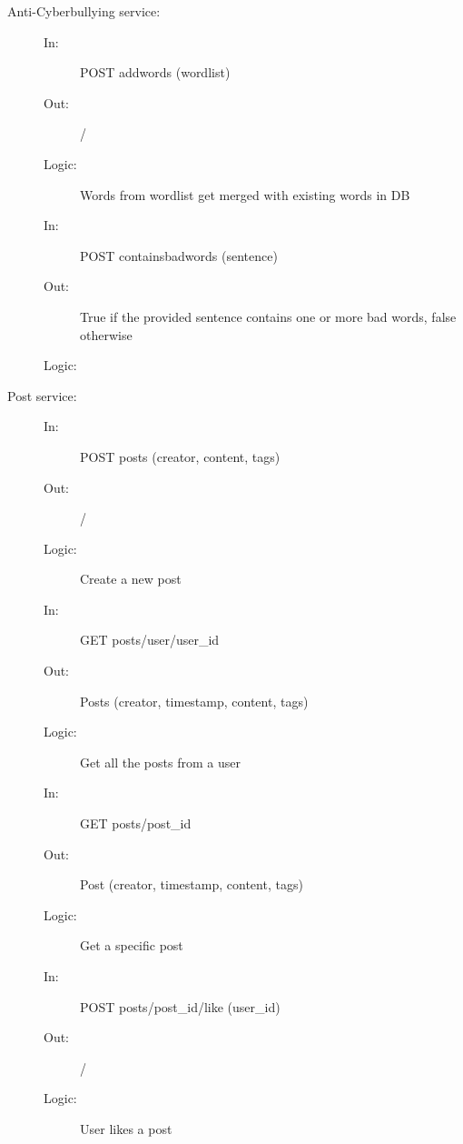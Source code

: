 \documentclass{article}
\begin{document}
\begin{description}
    \item [Anti-Cyberbullying service:] 
    \begin{description}
        \item[]
        \item[In:] POST addwords (wordlist)
        \item[Out:] /
        \item[Logic:] Words from wordlist get merged with existing words in DB
        \item[]
        
        \item[In:] POST containsbadwords (sentence)
        \item[Out:] True if the provided sentence contains one or more bad words, false otherwise
        \item[Logic:] 
        \item[]
    \end{description}
\end{description}

\begin{description}
    \item [Post service:] 
    \begin{description}
        \item[]
        \item[In:] POST posts (creator, content, tags)
        \item[Out:] /
        \item[Logic:] Create a new post
        \item[]

        \item[In:] GET posts/user/user\_id
        \item[Out:] Posts (creator, timestamp, content, tags)
        \item[Logic:] Get all the posts from a user
        \item[]

        \item[In:] GET posts/post\_id
        \item[Out:] Post (creator, timestamp, content, tags)
        \item[Logic:] Get a specific post
        \item[]
        
        \item[In:] POST posts/post\_id/like (user\_id)
        \item[Out:] /
        \item[Logic: ] User likes a post
    \end{description}
\end{description}
\end{document}

